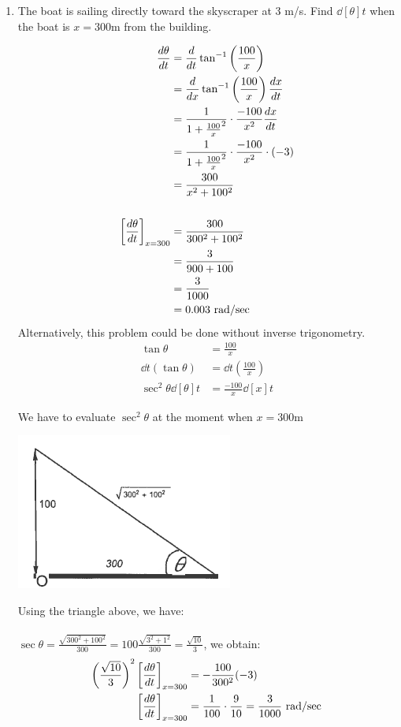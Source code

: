 \documentclass[nooutcomes]{ximera}
\begin{document}
\begin{problem}
\begin{enumerate}
	\item The boat is sailing directly toward the skyscraper at $3$ m/s.  Find $\dd[\theta]{t}$ when the boat is $x=300$m from the building.
	\begin{freeResponse}
	\begin{align*}
	\frac{d\theta}{dt}&=\dd{t}\tan^{-1}\left( \frac{100}{x} \right)\\
	&=\dd{x}\tan^{-1}\left( \frac{100}{x} \right)\dd[x]{t}\\
	&=\frac{1}{1+\frac{100}{x}^2} \cdot \frac{-100}{x^2} \dd[x]{t}\\
	&=\frac{1}{1+\frac{100}{x}^2} \cdot \frac{-100}{x^2} \cdot (-3)\\
	&=\frac{300}{x^2+100^2}\\\\
	\eval{\dd[\theta]{t}}_{x=300}&=\frac{300}{300^2+100^2}\\
	&=\frac{3}{900+100}\\
	&=\frac{3}{1000}\\
	&=0.003\ \text{rad/sec}
		\end{align*}
		Alternatively, this problem could be done without inverse trigonometry.\\
	\begin{align*}
	\tan\theta&=\frac{100}{x}\\
	\dd{t}(\tan\theta)&=\dd{t} \left(\frac{100}{x}\right)\\
	\sec^2\theta \dd[\theta]{t}&=\frac{-100}{x}\dd[x]{t}
	\end{align*}
	
	We have to evaluate $\sec^2\theta$ at the moment when $x=300$m\\
	    \begin{image}
      \includegraphics[scale = 0.7]{figure7.png}
    \end{image}
	Using the triangle above, we have:\\\\
	$\sec\theta=\frac{\sqrt{300^2+100^2}}{300}=100\frac{\sqrt{3^2+1^2}}{300}=\frac{\sqrt{10}}{3}$, we obtain:\\
	\begin{align*}
	\left(\frac{\sqrt{10}}{3}\right)^2 \eval{\dd[\theta]{t}}_{x=300}&=-\frac{100}{300^2}(-3)\\
	\eval{\dd[\theta]{t}}_{x=300}&=\frac{1}{100} \cdot\frac{9}{10}=\frac{3}{1000}\  \text{rad/sec}
	\end{align*}

	\end{freeResponse}
\end{enumerate}
\end{problem}
\end{document}
